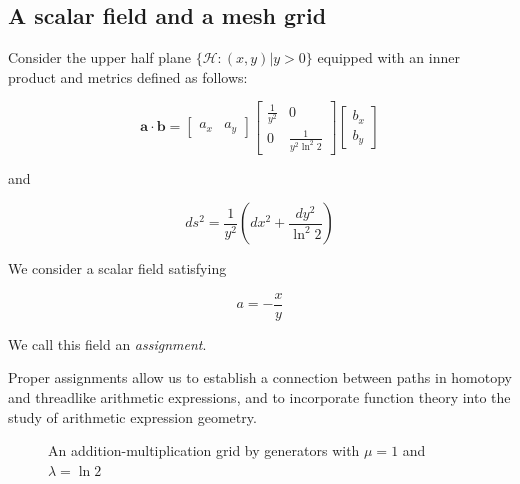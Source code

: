 \subsection{A scalar field and a mesh grid}\label{subsec:meshgrid}

Consider the upper half plane $\{\mathcal{H}: (x, y) | y > 0 \}$ equipped with an inner product and metrics defined as follows:

\[
\mathbf{a} \cdot \mathbf{b} = \begin{bmatrix} a_x & a_y \end{bmatrix} \begin{bmatrix} \frac{1}{y^2} & 0 \\ 0 & \frac{1}{y^2 \ln^2 2} \end{bmatrix} \begin{bmatrix} b_x \\ b_y \end{bmatrix}
\]

and

\[
ds^2 = \frac{1}{y^2} (dx^2 + \frac{dy^2}{\ln^2 2})
\]

We consider a scalar field satisfying

\begin{equation}
a = - \frac{x}{y}\label{eq:assignment}
\end{equation}

We call this field an \emph{assignment}.

Proper assignments allow us to establish a connection between paths in homotopy and threadlike arithmetic expressions,
and to incorporate function theory into the study of arithmetic expression geometry.

\begin{figure}[ht]
\centering
{}
\caption{An addition-multiplication grid by generators with $\mu=1$ and $\lambda=\ln 2$}\label{fig:gridex0}
\end{figure}

